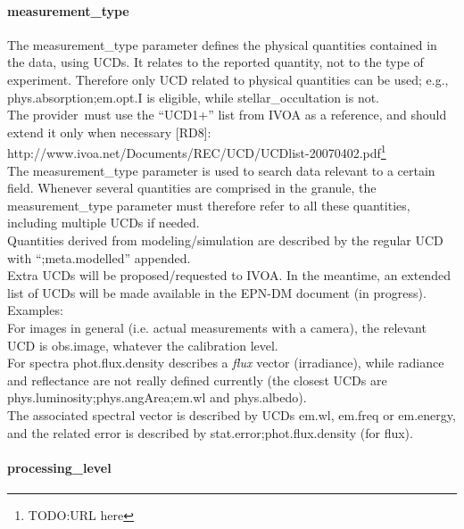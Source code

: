 \documentclass[11pt,a4paper]{ivoa}
\begin{document}
\paragraph{measurement\_type}

The measurement\_type parameter defines the physical quantities contained in the data, using UCDs. It relates to the reported quantity, not to the type of experiment. Therefore only UCD related to physical quantities can be used; e.g., phys.absorption;em.opt.I is eligible, while stellar\_occultation is not. \\ The provider must use the ``UCD1+'' list from IVOA as a reference, and should extend it only when necessary [RD8]:\\ http://www.ivoa.net/Documents/REC/UCD/UCDlist-20070402.pdf\footnote{TODO:URL here} \\ The measurement\_type parameter is used to search data relevant to a certain field. Whenever several quantities are comprised in the granule, the measurement\_type parameter must therefore refer to all these quantities, including multiple UCDs if needed.\\Quantities derived from modeling/simulation are described by the regular UCD with ``;meta.modelled'' appended.\\ Extra UCDs will be proposed/requested to IVOA. In the meantime, an extended list of UCDs will be made available in the EPN-DM document (in progress). \\ Examples:\\ For images in general (i.e. actual measurements with a camera), the relevant UCD is obs.image, whatever the calibration level.\\ For spectra phot.flux.density describes a \emph{flux} vector (irradiance), while radiance and reflectance are not really defined currently (the closest UCDs are phys.luminosity;phys.angArea;em.wl and phys.albedo).\\The associated spectral vector is described by UCDs em.wl, em.freq or em.energy, and the related error is described by stat.error;phot.flux.density (for flux).

\paragraph{processing\_level}
\end{document}

